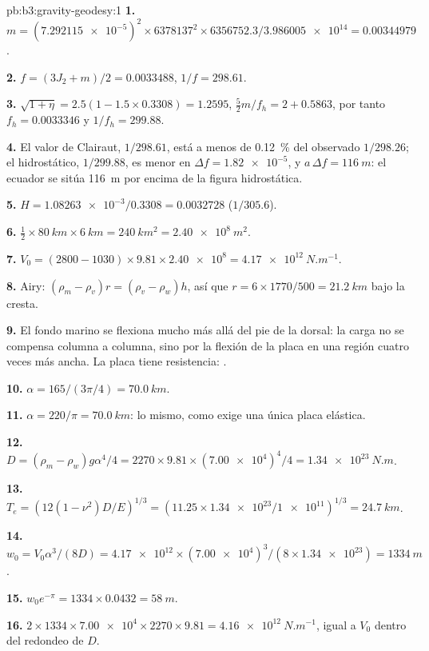 \begin{solution}{pb:b3:gravity-geodesy:1}
\textbf{1.} $m = (\num{7.292115e-5})^2\times6378137^2\times6356752.3/
\num{3.986005e14} = \num{0.00344979}$.

\textbf{2.} $f = (3J_2 + m)/2 = \num{0.0033488}$, $1/f = 298.61$.

\textbf{3.} $\sqrt{1 + \eta} = 2.5(1 - 1.5\times0.3308) = 1.2595$,
$\tfrac52m/f_h = 2 + 0.5863$, por tanto $f_h = \num{0.0033346}$ y $1/f_h = 299.88$.

\textbf{4.} El valor de Clairaut, $1/298.61$, está a menos de \qty{0.12}{\percent} del
observado $1/298.26$; el hidrostático, $1/299.88$, es menor en
$\Delta f = \num{1.82e-5}$, y $a\,\Delta f = \qty{116}{m}$: el ecuador se sitúa
\qty{116}{m} por encima de la figura hidrostática.

\textbf{5.} $H = \num{1.08263e-3}/0.3308 = \num{0.0032728}$ ($1/305.6$).

\textbf{6.} $\tfrac12\times\qty{80}{km}\times\qty{6}{km} = \qty{240}{km^2} =
\qty{2.40e8}{m^2}$.

\textbf{7.} $V_0 = (2800 - 1030)\times9.81\times\num{2.40e8} =
\qty{4.17e12}{N.m^{-1}}$.

\textbf{8.} Airy: $(\rho_m - \rho_v)r = (\rho_v - \rho_w)h$, así que $r =
6\times1770/500 = \qty{21.2}{km}$ bajo la cresta.

\textbf{9.} El fondo marino se flexiona mucho más allá del pie de la dorsal: la
carga no se compensa columna a columna, sino por la flexión de la placa en una
región cuatro veces más ancha. La placa tiene resistencia: .

\textbf{10.} $\alpha = 165/(3\pi/4) = \qty{70.0}{km}$.

\textbf{11.} $\alpha = 220/\pi = \qty{70.0}{km}$: lo mismo, como exige una única
placa elástica.

\textbf{12.} $D = (\rho_m - \rho_w)g\alpha^4/4 = 2270\times9.81\times(\num{7.00e4})^4/4
= \qty{1.34e23}{N.m}$.

\textbf{13.} $T_e = (12(1 - \nu^2)D/E)^{1/3} = (11.25\times\num{1.34e23}/
\num{1e11})^{1/3} = \qty{24.7}{km}$.

\textbf{14.} $w_0 = V_0\alpha^3/(8D) = \num{4.17e12}\times(\num{7.00e4})^3/
(8\times\num{1.34e23}) = \qty{1334}{m}$.

\textbf{15.} $w_0e^{-\pi} = 1334\times0.0432 = \qty{58}{m}$.

\textbf{16.} $2\times1334\times\num{7.00e4}\times2270\times9.81 =
\qty{4.16e12}{N.m^{-1}}$, igual a $V_0$ dentro del redondeo de $D$.


\end{solution}
